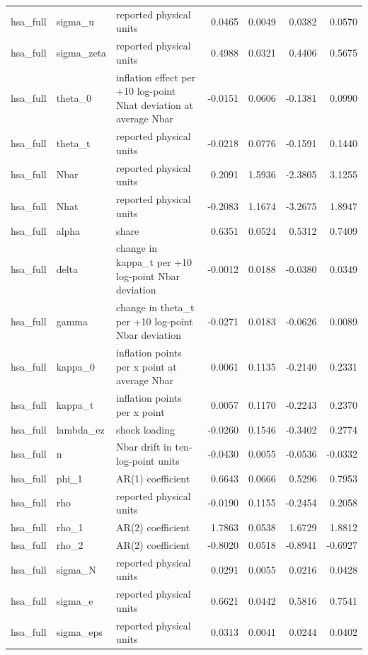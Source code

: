 \begin{tabular}{lllrrrr}
hsa\_full & sigma\_u & reported physical units & 0.0465 & 0.0049 & 0.0382 & 0.0570 \\
hsa\_full & sigma\_zeta & reported physical units & 0.4988 & 0.0321 & 0.4406 & 0.5675 \\
hsa\_full & theta\_0 & inflation effect per +10 log-point Nhat deviation at average Nbar & -0.0151 & 0.0606 & -0.1381 & 0.0990 \\
hsa\_full & theta\_t & reported physical units & -0.0218 & 0.0776 & -0.1591 & 0.1440 \\
hsa\_full & Nbar & reported physical units & 0.2091 & 1.5936 & -2.3805 & 3.1255 \\
hsa\_full & Nhat & reported physical units & -0.2083 & 1.1674 & -3.2675 & 1.8947 \\
hsa\_full & alpha & share & 0.6351 & 0.0524 & 0.5312 & 0.7409 \\
hsa\_full & delta & change in kappa\_t per +10 log-point Nbar deviation & -0.0012 & 0.0188 & -0.0380 & 0.0349 \\
hsa\_full & gamma & change in theta\_t per +10 log-point Nbar deviation & -0.0271 & 0.0183 & -0.0626 & 0.0089 \\
hsa\_full & kappa\_0 & inflation points per x point at average Nbar & 0.0061 & 0.1135 & -0.2140 & 0.2331 \\
hsa\_full & kappa\_t & inflation points per x point & 0.0057 & 0.1170 & -0.2243 & 0.2370 \\
hsa\_full & lambda\_ez & shock loading & -0.0260 & 0.1546 & -0.3402 & 0.2774 \\
hsa\_full & n & Nbar drift in ten-log-point units & -0.0430 & 0.0055 & -0.0536 & -0.0332 \\
hsa\_full & phi\_1 & AR(1) coefficient & 0.6643 & 0.0666 & 0.5296 & 0.7953 \\
hsa\_full & rho & reported physical units & -0.0190 & 0.1155 & -0.2454 & 0.2058 \\
hsa\_full & rho\_1 & AR(2) coefficient & 1.7863 & 0.0538 & 1.6729 & 1.8812 \\
hsa\_full & rho\_2 & AR(2) coefficient & -0.8020 & 0.0518 & -0.8941 & -0.6927 \\
hsa\_full & sigma\_N & reported physical units & 0.0291 & 0.0055 & 0.0216 & 0.0428 \\
hsa\_full & sigma\_e & reported physical units & 0.6621 & 0.0442 & 0.5816 & 0.7541 \\
hsa\_full & sigma\_eps & reported physical units & 0.0313 & 0.0041 & 0.0244 & 0.0402 \\

\end{tabular}
